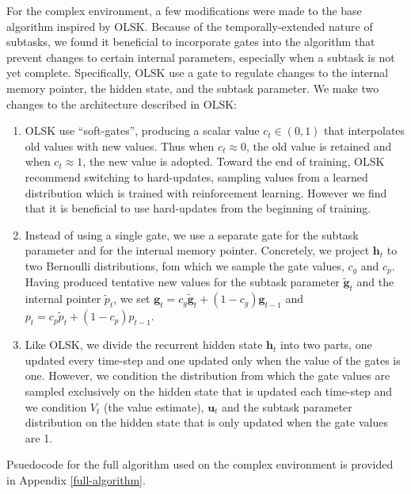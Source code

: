 \documentclass{article}
\DeclareMathOperator{\clip}{clip}
\begin{document}
For the complex environment, a few modifications were made to the base algorithm
inspired by OLSK. Because of the temporally-extended nature of subtasks, we
found it beneficial to incorporate gates into the algorithm that prevent changes
to certain internal parameters, especially when a subtask is not yet complete.
Specifically, OLSK use a gate to regulate changes to the internal memory
pointer, the hidden state, and the subtask parameter.
We make two changes to the architecture described in OLSK:
\begin{enumerate}
  \item OLSK use ``soft-gates'', producing a scalar value $c_t \in (0, 1)$ that
    interpolates old values with new values. Thus when $c_t \approx 0$, the old
    value is retained and when $c_t \approx 1$, the new value is adopted. Toward
    the end of training, 
    OLSK recommend switching to hard-updates, sampling values from a learned
    distribution which is trained with reinforcement learning. However we find
    that it is beneficial to use hard-updates from the beginning of training.
  \item Instead of using a single gate, we use a separate gate for the
    subtask parameter and for the internal memory pointer.
Concretely, we project $\mathbf{h}_t$ to two Bernoulli distributions, fom which
we sample the gate values, $c_g$ and $c_p$. Having produced tentative new values
for the subtask parameter $\tilde{\mathbf{g}}_t$ and the internal pointer
$\tilde{p}_t$, we set $\mathbf{g}_t = c_g\tilde{\mathbf{g}}_t + (1 -
c_g)\mathbf{g}_{t-1}$ and  $p_t = c_p\tilde{p}_t + (1 - c_p)p_{t-1}$.

  \item Like OLSK, we divide the recurrent hidden state $\mathbf{h}_t$ into two
    parts, one updated every time-step and one updated only when the value of
    the gates is one. However, we condition the distribution from which the gate
    values are sampled exclusively on the hidden state that is updated each
    time-step and we condition $V_t$ (the value estimate), $\mathbf{u}_t$ and
    the subtask parameter distribution on the hidden state that is only updated
    when the gate values are 1.
\end{enumerate}

Psuedocode for the full algorithm used on the complex environment is provided in
Appendix \ref{full-algorithm}.
\end{document}
